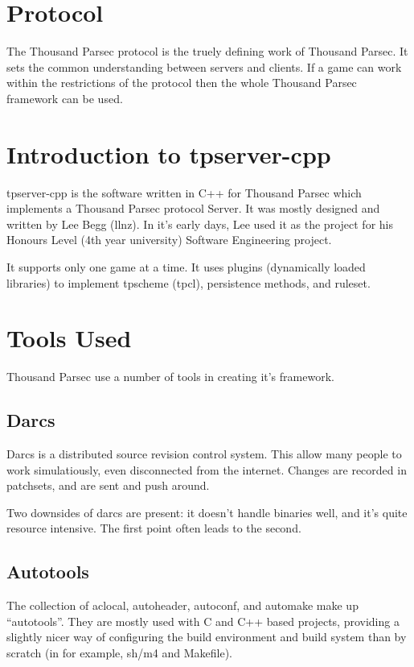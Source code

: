 \documentclass[a4paper,11pt]{report}
\begin{document}
\chapter{Protocol}
\label{chap:protocol-intro}

The Thousand Parsec protocol is the truely defining work of Thousand Parsec. It sets the common understanding between servers and clients. If a game can work within the restrictions of the protocol then the whole Thousand Parsec framework can be used.

\chapter{Introduction to tpserver-cpp}
\label{chap:tpserver-cpp-intro}
tpserver-cpp is the software written in C++ for Thousand Parsec which implements a Thousand Parsec protocol Server. It was mostly designed and written by Lee Begg (llnz). In it's early days, Lee used it as the project for his Honours Level (4th year university) Software Engineering project.

It supports only one game at a time. It uses plugins (dynamically loaded libraries) to implement tpscheme (tpcl), persistence methods, and ruleset.

\chapter{Tools Used}
\label{chap:tools}

Thousand Parsec use a number of tools in creating it's framework.

\section{Darcs}
\label{sec:darcs}

Darcs is a distributed source revision control system. This allow many people to work simulatiously, even disconnected from the internet. Changes are recorded in patchsets, and are sent and push around.

Two downsides of darcs are present: it doesn't handle binaries well, and it's quite resource intensive. The first point often leads to the second.

\section{Autotools}
\label{sec:autotools}

The collection of aclocal, autoheader, autoconf, and automake make up ``autotools''. They are mostly used with C and C++ based projects, providing a slightly nicer way of configuring the build environment and build system than by scratch (in for example, sh/m4 and Makefile).
\end{document}

